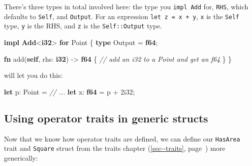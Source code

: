\documentclass[a4paper,]{book}
\renewcommand*{\hyperref}[2][\ar]{%
  \def\ar{#2}%
  #2 (\autoref{#1}, page~\pageref{#1})}
\newenvironment{Shaded}{\begin{snugshade}}{\end{snugshade}}
\newcommand{\KeywordTok}[1]{\textcolor[rgb]{0.13,0.29,0.53}{\textbf{{#1}}}}
\newcommand{\DecValTok}[1]{\textcolor[rgb]{0.00,0.00,0.81}{{#1}}}
\newcommand{\CommentTok}[1]{\textcolor[rgb]{0.56,0.35,0.01}{\textit{{#1}}}}
\newcommand{\NormalTok}[1]{{#1}}
\begin{document}
There's three types in total involved here: the type you
\texttt{impl\ Add} for, \texttt{RHS}, which defaults to \texttt{Self},
and \texttt{Output}. For an expression \texttt{let\ z\ =\ x\ +\ y},
\texttt{x} is the \texttt{Self} type, \texttt{y} is the RHS, and
\texttt{z} is the \texttt{Self::Output} type.

\begin{Shaded}
\begin{Highlighting}[]
\KeywordTok{impl} \KeywordTok{Add}\NormalTok{<}\KeywordTok{i32}\NormalTok{> }\KeywordTok{for} \NormalTok{Point \{}
    \KeywordTok{type} \NormalTok{Output = }\KeywordTok{f64}\NormalTok{;}

    \KeywordTok{fn} \NormalTok{add(}\KeywordTok{self}\NormalTok{, rhs: }\KeywordTok{i32}\NormalTok{) -> }\KeywordTok{f64} \NormalTok{\{}
        \CommentTok{// add an i32 to a Point and get an f64}
    \NormalTok{\}}
\NormalTok{\}}
\end{Highlighting}
\end{Shaded}

will let you do this:

\begin{Shaded}
\begin{Highlighting}[]
\KeywordTok{let} \NormalTok{p: Point = }\CommentTok{// ...}
\KeywordTok{let} \NormalTok{x: }\KeywordTok{f64} \NormalTok{= p + }\DecValTok{2i32}\NormalTok{;}
\end{Highlighting}
\end{Shaded}

\subsection{Using operator traits in generic
structs}\label{using-operator-traits-in-generic-structs}

Now that we know how operator traits are defined, we can define our
\texttt{HasArea} trait and \texttt{Square} struct from the
\hyperref[sec--traits]{traits chapter} more generically:
\end{document}

